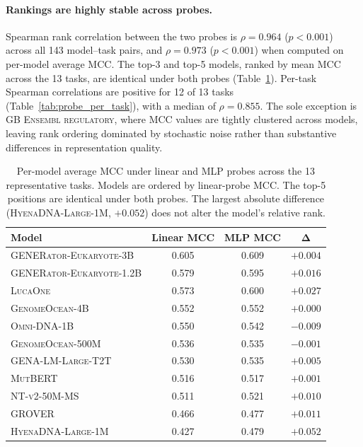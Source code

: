 \documentclass{article}
\theoremstyle{plain}
\theoremstyle{definition}
\theoremstyle{remark}
\begin{document}
\paragraph{Rankings are highly stable across probes.}
Spearman rank correlation between the two probes is $\rho = 0.964$
($p < 0.001$) across all 143 model--task pairs, and $\rho = 0.973$
($p < 0.001$) when computed on per-model average MCC. The top-3 and
top-5 models, ranked by mean MCC across the 13 tasks, are identical
under both probes (Table~\ref{tab:probe_rankings}). Per-task Spearman
correlations are positive for 12 of 13 tasks
(Table~\ref{tab:probe_per_task}), with a median of $\rho = 0.855$. The
sole exception is \textsc{GB Ensembl regulatory}, where MCC values
are tightly clustered across models, leaving rank ordering dominated by
stochastic noise rather than substantive differences in representation
quality.

\begin{table}[h]
\centering
\caption{Per-model average MCC under linear and MLP probes across the 13
representative tasks. Models are ordered by linear-probe MCC. The top-5
positions are identical under both probes. The largest absolute
difference (\textsc{HyenaDNA-Large-1M}, $+0.052$) does not alter the
model's relative rank.}
\label{tab:probe_rankings}
\small
\begin{tabular}{@{}lccc@{}}
\toprule
\textbf{Model} & \textbf{Linear MCC} & \textbf{MLP MCC} & $\boldsymbol{\Delta}$ \\
\midrule
\textsc{GENERator-Eukaryote-3B}    & 0.605 & 0.609 & $+0.004$ \\
\textsc{GENERator-Eukaryote-1.2B}  & 0.579 & 0.595 & $+0.016$ \\
\textsc{LucaOne}                    & 0.573 & 0.600 & $+0.027$ \\
\textsc{GenomeOcean-4B}            & 0.552 & 0.552 & $+0.000$ \\
\textsc{Omni-DNA-1B}                & 0.550 & 0.542 & $-0.009$ \\
\textsc{GenomeOcean-500M}          & 0.536 & 0.535 & $-0.001$ \\
\textsc{GENA-LM-Large-T2T}         & 0.530 & 0.535 & $+0.005$ \\
\textsc{MutBERT}                    & 0.516 & 0.517 & $+0.001$ \\
\textsc{NT-v2-50M-MS}              & 0.511 & 0.521 & $+0.010$ \\
\textsc{GROVER}                     & 0.466 & 0.477 & $+0.011$ \\
\textsc{HyenaDNA-Large-1M}         & 0.427 & 0.479 & $+0.052$ \\
\bottomrule
\end{tabular}
\end{table}
\end{document}
